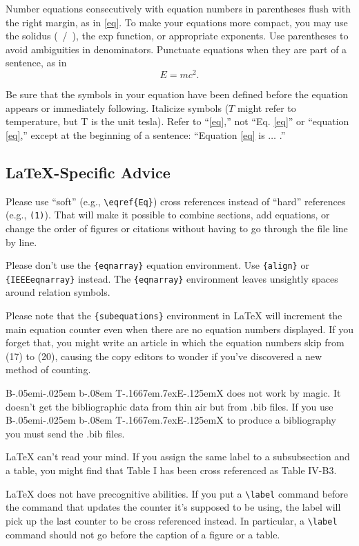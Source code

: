 \documentclass[journal,twoside,web]{ieeecolor2}
\def\BibTeX{{\rm B\kern-.05em{\sc i\kern-.025em b}\kern-.08em
    T\kern-.1667em\lower.7ex\hbox{E}\kern-.125emX}}
\begin{document}
Number equations consecutively with equation numbers in parentheses flush 
with the right margin, as in \eqref{eq}. To make your equations more 
compact, you may use the solidus (~/~), the exp function, or appropriate 
exponents. Use parentheses to avoid ambiguities in denominators. Punctuate 
equations when they are part of a sentence, as in
\begin{equation}E=mc^2.\label{eq}\end{equation}

Be sure that the symbols in your equation have been defined before the 
equation appears or immediately following. Italicize symbols ($T$ might refer 
to temperature, but T is the unit tesla). Refer to ``\eqref{eq},'' not ``Eq. \eqref{eq}'' 
or ``equation \eqref{eq},'' except at the beginning of a sentence: ``Equation \eqref{eq} 
is $\ldots$ .''

\subsection{\LaTeX-Specific Advice}

Please use ``soft'' (e.g., \verb|\eqref{Eq}|) cross references instead
of ``hard'' references (e.g., \verb|(1)|). That will make it possible
to combine sections, add equations, or change the order of figures or
citations without having to go through the file line by line.

Please don't use the \verb|{eqnarray}| equation environment. Use
\verb|{align}| or \verb|{IEEEeqnarray}| instead. The \verb|{eqnarray}|
environment leaves unsightly spaces around relation symbols.

Please note that the \verb|{subequations}| environment in {\LaTeX}
will increment the main equation counter even when there are no
equation numbers displayed. If you forget that, you might write an
article in which the equation numbers skip from (17) to (20), causing
the copy editors to wonder if you've discovered a new method of
counting.

{\BibTeX} does not work by magic. It doesn't get the bibliographic
data from thin air but from .bib files. If you use {\BibTeX} to produce a
bibliography you must send the .bib files. 

{\LaTeX} can't read your mind. If you assign the same label to a
subsubsection and a table, you might find that Table I has been cross
referenced as Table IV-B3. 

{\LaTeX} does not have precognitive abilities. If you put a
\verb|\label| command before the command that updates the counter it's
supposed to be using, the label will pick up the last counter to be
cross referenced instead. In particular, a \verb|\label| command
should not go before the caption of a figure or a table.
\end{document}
